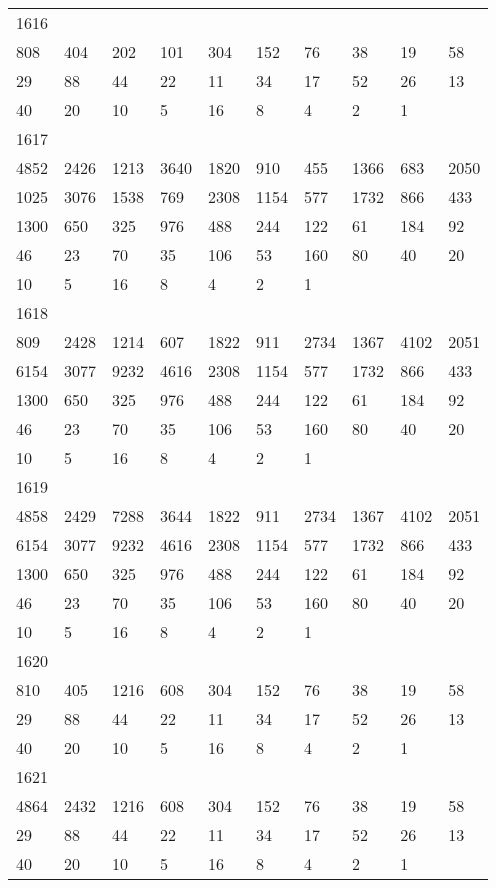 \begin{longtable}{*{10}{l}}
1616&&&&&&&&&\\
808& 404& 202& 101& 304& 152& 76& 38& 19& 58\\
29& 88& 44& 22& 11& 34& 17& 52& 26& 13\\
40& 20& 10& 5& 16& 8& 4& 2& 1& \\

1617&&&&&&&&&\\
4852& 2426& 1213& 3640& 1820& 910& 455& 1366& 683& 2050\\
1025& 3076& 1538& 769& 2308& 1154& 577& 1732& 866& 433\\
1300& 650& 325& 976& 488& 244& 122& 61& 184& 92\\
46& 23& 70& 35& 106& 53& 160& 80& 40& 20\\
10& 5& 16& 8& 4& 2& 1& \\

1618&&&&&&&&&\\
809& 2428& 1214& 607& 1822& 911& 2734& 1367& 4102& 2051\\
6154& 3077& 9232& 4616& 2308& 1154& 577& 1732& 866& 433\\
1300& 650& 325& 976& 488& 244& 122& 61& 184& 92\\
46& 23& 70& 35& 106& 53& 160& 80& 40& 20\\
10& 5& 16& 8& 4& 2& 1& \\

1619&&&&&&&&&\\
4858& 2429& 7288& 3644& 1822& 911& 2734& 1367& 4102& 2051\\
6154& 3077& 9232& 4616& 2308& 1154& 577& 1732& 866& 433\\
1300& 650& 325& 976& 488& 244& 122& 61& 184& 92\\
46& 23& 70& 35& 106& 53& 160& 80& 40& 20\\
10& 5& 16& 8& 4& 2& 1& \\

1620&&&&&&&&&\\
810& 405& 1216& 608& 304& 152& 76& 38& 19& 58\\
29& 88& 44& 22& 11& 34& 17& 52& 26& 13\\
40& 20& 10& 5& 16& 8& 4& 2& 1& \\

1621&&&&&&&&&\\
4864& 2432& 1216& 608& 304& 152& 76& 38& 19& 58\\
29& 88& 44& 22& 11& 34& 17& 52& 26& 13\\
40& 20& 10& 5& 16& 8& 4& 2& 1& \\


\end{longtable}
